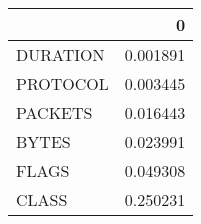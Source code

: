 \begin{tabular}{lr}
\toprule
{} &         0 \\
\midrule
DURATION &  0.001891 \\
PROTOCOL &  0.003445 \\
PACKETS  &  0.016443 \\
BYTES    &  0.023991 \\
FLAGS    &  0.049308 \\
CLASS    &  0.250231 \\
\bottomrule
\end{tabular}
